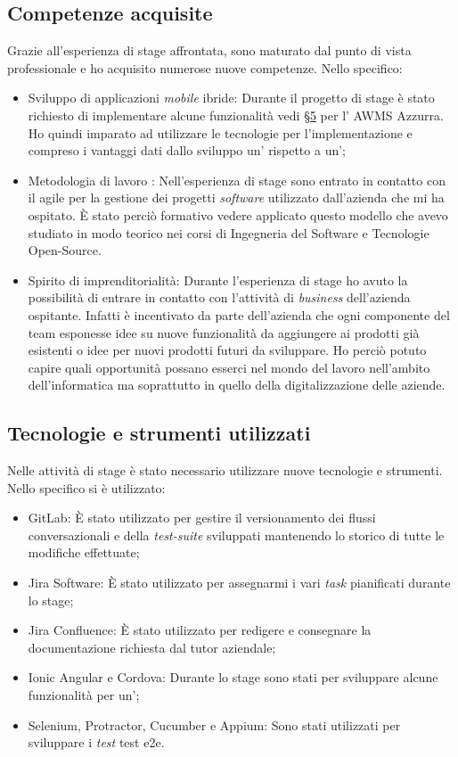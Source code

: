 \subsection{Competenze acquisite}
Grazie all'esperienza di stage affrontata, sono maturato dal punto di vista professionale e ho acquisito numerose nuove competenze. Nello specifico:
\begin{itemize}
	\item Sviluppo di applicazioni \emph{mobile} ibride: Durante il progetto di stage è stato richiesto di implementare alcune funzionalità vedi \hyperref[cap:flussi di conversazione]{§5} per l' \gls{AWMS} Azzurra. Ho quindi imparato ad utilizzare le tecnologie per l'implementazione e compreso i vantaggi dati dallo sviluppo un' rispetto a un';
	\item Metodologia di lavoro : Nell'esperienza di stage sono entrato in contatto con il  agile per la gestione dei progetti \emph{software}  utilizzato dall'azienda che mi ha ospitato. È stato perciò formativo vedere applicato questo modello che avevo studiato in modo teorico nei corsi di Ingegneria del Software e Tecnologie Open-Source.
	\item Spirito di imprenditorialità: Durante l'esperienza di stage ho avuto la possibilità di entrare in contatto con l'attività di \emph{business} dell'azienda ospitante. Infatti è incentivato da parte dell'azienda che ogni componente del team esponesse idee su nuove funzionalità da aggiungere ai prodotti già esistenti o idee per nuovi prodotti futuri da sviluppare.
	 Ho perciò potuto capire quali opportunità possano esserci nel mondo del lavoro nell'ambito dell'informatica ma soprattutto in quello della digitalizzazione delle aziende.
\end{itemize}
\subsection{Tecnologie e strumenti utilizzati}
Nelle attività di stage è stato necessario utilizzare nuove tecnologie e strumenti. Nello specifico si è utilizzato:
\begin{itemize}
	\item GitLab: È stato utilizzato per gestire il versionamento dei flussi conversazionali e della \emph{test-suite} sviluppati mantenendo lo storico di tutte le modifiche effettuate;
	\item Jira Software: È stato utilizzato per assegnarmi i vari \emph{task} pianificati durante lo stage;
	\item Jira Confluence: È stato utilizzato per redigere e consegnare la documentazione richiesta dal tutor aziendale;
	\item Ionic Angular e Cordova: Durante lo stage sono stati per sviluppare alcune funzionalità per un';
	\item Selenium, Protractor, Cucumber e Appium: Sono stati utilizzati per sviluppare i \emph{test} \gls{test e2e}.
\end{itemize}

